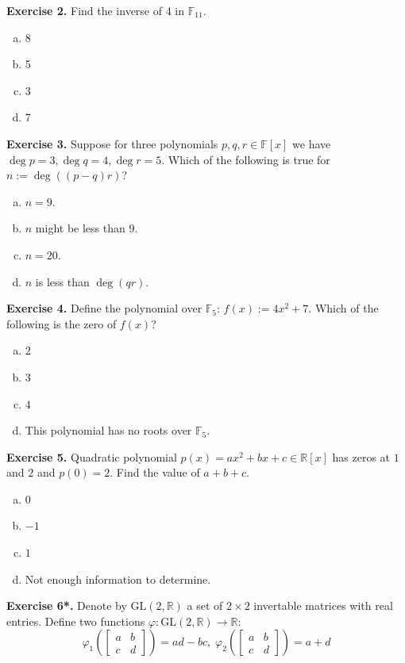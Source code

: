 \documentclass[../lecture-notes.tex]{subfiles}
\begin{document}
\textbf{Exercise 2.} Find the inverse of $4$ in $\mathbb{F}_{11}$.
\begin{enumerate}[a)]
    \item 8
    \item 5
    \item 3
    \item 7
\end{enumerate}

\textbf{Exercise 3.} Suppose for three polynomials $p,q,r \in \mathbb{F}[x]$ we have $\deg p = 3, \deg q = 4, \deg r = 5$. Which of the following is true for $n := \deg ((p-q)r)$?
\begin{enumerate}[a)]
    \item $n = 9$.
    \item $n$ might be less than $9$.
    \item $n = 20$.
    \item $n$ is less than $\deg (qr)$. 
\end{enumerate}

\textbf{Exercise 4.} Define the polynomial over $\mathbb{F}_5$: $f(x) := 4x^2 + 7$. Which of the following is the zero of $f(x)$?
\begin{enumerate}[a)]
    \item $2$
    \item $3$
    \item $4$
    \item This polynomial has no roots over $\mathbb{F}_5$.
\end{enumerate}

\textbf{Exercise 5.} Quadratic polynomial $p(x) = ax^2+bx+c \in \mathbb{R}[x]$ has zeros at $1$ and $2$ and $p(0) = 2$. Find the value of $a+b+c$.
\begin{enumerate}[a)]
    \item $0$
    \item $-1$
    \item $1$
    \item Not enough information to determine.
\end{enumerate}

\textbf{Exercise 6*.} Denote by $\text{GL}(2,\mathbb{R})$ a set of $2\times 2$ invertable matrices with real entries. Define two functions $\varphi: \text{GL}(2,\mathbb{R}) \to \mathbb{R}$:
\begin{equation}
    \varphi_1 \left(\begin{bmatrix}
        a & b \\ c & d
    \end{bmatrix}\right) = ad - bc, \; \varphi_2 \left(\begin{bmatrix}
        a & b \\ c & d
    \end{bmatrix}\right) = a + d
\end{equation}
\end{document}
